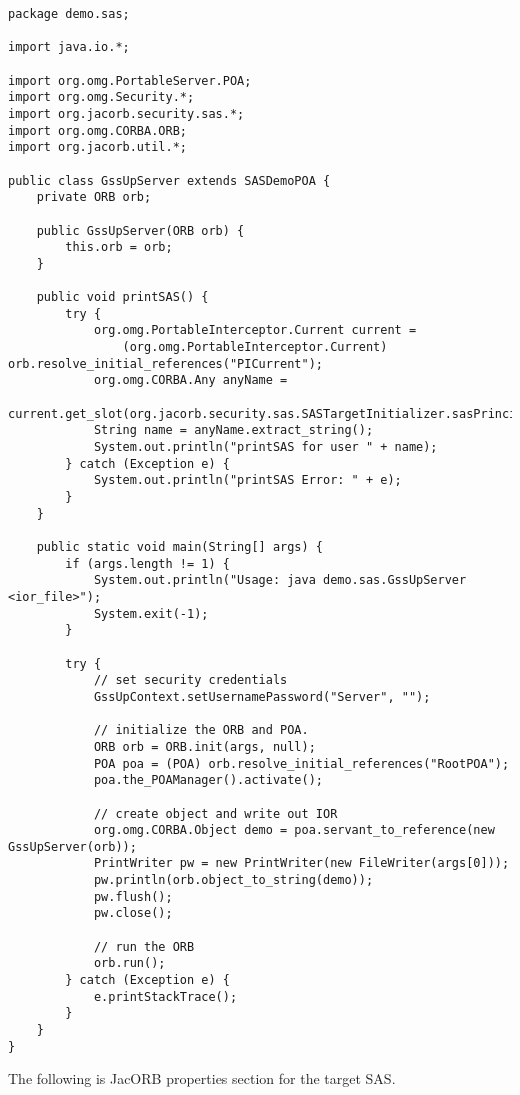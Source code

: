 \begin{scriptsize}
\begin{verbatim}
package demo.sas;

import java.io.*;

import org.omg.PortableServer.POA;
import org.omg.Security.*;
import org.jacorb.security.sas.*;
import org.omg.CORBA.ORB;
import org.jacorb.util.*;

public class GssUpServer extends SASDemoPOA {
    private ORB orb;

    public GssUpServer(ORB orb) {
        this.orb = orb;
    }

    public void printSAS() {
        try {
            org.omg.PortableInterceptor.Current current = 
                (org.omg.PortableInterceptor.Current) orb.resolve_initial_references("PICurrent");
            org.omg.CORBA.Any anyName = 
                current.get_slot(org.jacorb.security.sas.SASTargetInitializer.sasPrincipalNamePIC);
            String name = anyName.extract_string();
            System.out.println("printSAS for user " + name);
        } catch (Exception e) {
            System.out.println("printSAS Error: " + e);
        }
    }

    public static void main(String[] args) {
        if (args.length != 1) {
            System.out.println("Usage: java demo.sas.GssUpServer <ior_file>");
            System.exit(-1);
        }

        try {
            // set security credentials
            GssUpContext.setUsernamePassword("Server", "");

            // initialize the ORB and POA.
            ORB orb = ORB.init(args, null);
            POA poa = (POA) orb.resolve_initial_references("RootPOA");
            poa.the_POAManager().activate();
			
            // create object and write out IOR
            org.omg.CORBA.Object demo = poa.servant_to_reference(new GssUpServer(orb));
            PrintWriter pw = new PrintWriter(new FileWriter(args[0]));
            pw.println(orb.object_to_string(demo));
            pw.flush();
            pw.close();
			
            // run the ORB
            orb.run();
        } catch (Exception e) {
            e.printStackTrace();
        }
    }
}
\end{verbatim}
\end{scriptsize}

The following is JacORB properties section for the target SAS.

